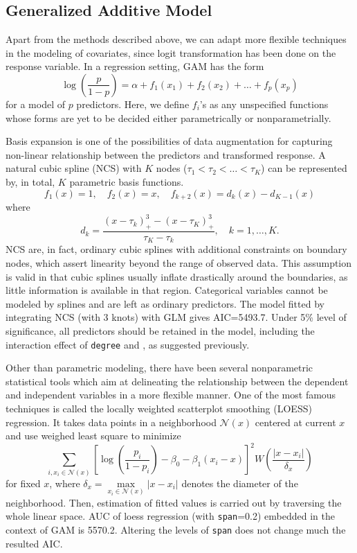 \subsection{Generalized Additive Model}
Apart from the methods described above, we can adapt more flexible techniques in the modeling of covariates, since logit transformation has been done on the response variable. In a regression setting, GAM has the form
\[
\log\left(\frac{p}{1-p}\right)=\alpha+f_1(x_1)+f_2(x_2)+\dots+f_p(x_p)
\]
for a model of $p$ predictors. Here, we define $f_i$'s as any unspecified functions whose forms are yet to be decided either parametrically or nonparametrially. 
\par Basis expansion is one of the possibilities of data augmentation for capturing non-linear relationship between the predictors and transformed response. A natural cubic spline (NCS) with $K$ nodes ($\tau_1<\tau_2<\dots<\tau_K$) can be represented by, in total, $K$ parametric basis functions.
\[
f_1(x)=1,\quad f_2(x)=x, \quad f_{k+2}(x)=d_k(x)-d_{K-1}(x)
\]
where
\[
d_{k}=\frac{(x-\tau_k)^3_+-(x-\tau_K)^3_+}{\tau_K-\tau_k},\quad k=1,\dots,K.
\]
NCS are, in fact, ordinary cubic splines with additional constraints on boundary nodes, which assert linearity beyond the range of observed data. This assumption is valid in that cubic splines usually inflate drastically around the boundaries, as little information is available in that region. Categorical variables cannot be modeled by splines and are left as ordinary predictors. The model fitted by integrating NCS (with 3 knots) with GLM gives AIC=5493.7. Under 5\% level of significance, all predictors should be retained in the model, including the interaction effect of \texttt{degree} and , as suggested previously.
\par Other than parametric modeling, there have been several nonparametric statistical tools which aim at delineating the relationship between the dependent and independent variables in a more flexible manner. One of the most famous techniques is called the locally weighted scatterplot smoothing (LOESS) regression. It takes data points in a neighborhood $\mathcal{N}(x)$ centered at current $x$ and use weighed least square to minimize
\[
\sum_{i, x_i\in \mathcal{N}(x)}\left[\log\left(\frac{p_i}{1-p_i}\right)-\beta_0-\beta_1(x_i-x)\right]^2W\left(\frac{|x-x_i|}{\delta_x}\right)
\]
for fixed $x$, where $\delta_x=\underset{x_i\in \mathcal{N}(x)}{\max}|x-x_i|$ denotes the diameter of the neighborhood. Then, estimation of fitted values is carried out by traversing the whole linear space. AUC of loess regression (with \texttt{span}=0.2) embedded in the context of GAM is 5570.2. Altering the levels of \texttt{span} does not change much the resulted AIC.
